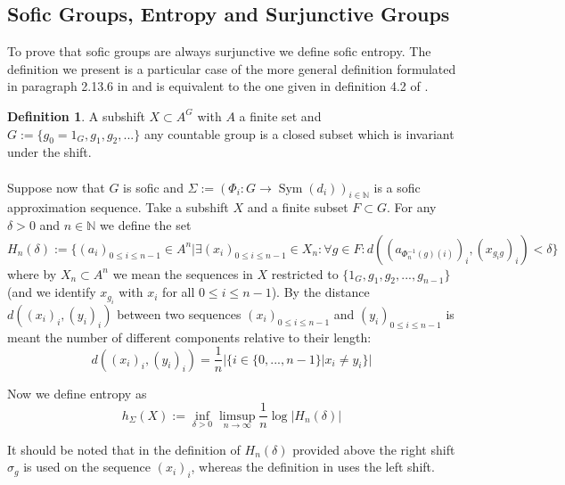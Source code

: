 \documentclass[titlepage, a4paper]{article}
\newcommand{\N}{\mathbb{N}}
\DeclareMathOperator{\sym}{Sym}
\theoremstyle{definition}
\newtheorem{definition}[theorem]{Definition}
\theoremstyle{remark}
\begin{document}
\subsection{Sofic Groups, Entropy and Surjunctive Groups}\label{ssec:sofic_surjunctive}

To prove that sofic groups are always surjunctive we define sofic entropy. The definition we present is a particular case of the more general definition formulated in paragraph 2.13.6 in \cite{capraro_lupini_2015} and is equivalent to the one given in definition 4.2 of \cite{kerr_li_2010}. 

\begin{definition}

A subshift $X \subset A^G$ with $A$ a finite set and $G := \{g_0 = 1_G, g_1, g_2, ...\}$ any countable group is a closed subset which is invariant under the shift.\\
\\
Suppose now that $G$ is sofic and $\Sigma := (\Phi_i: G \to \sym(d_i))_{i \in \N}$ is a sofic approximation sequence. Take a subshift $X$ and a finite subset $F \subset G$. For any $\delta > 0$ and $n \in \N$ we define the set 
		\[
		H_n (\delta) := \{(a_i)_{0 \leq i \leq n-1} \in A^n | 
						\exists (x_i)_{0 \leq i \leq n-1} \in X_n : 
						\forall g \in F: d((a_{\Phi^{-1}_n(g)(i)})_i,(x_{ g_i g})_i) < \delta \}
		\]
		where by $X_n \subset A^n$ we mean the sequences in $X$ restricted to $\{1_G, g_1, g_2, ..., g_{n-1}\}$ (and we identify $x_{g_i}$ with $x_i$ for all $0 \leq i \leq n-1$). By the distance $d((x_i)_i, (y_i)_i)$ between two sequences $(x_i)_{0 \leq i \leq n-1}$ and $(y_i)_{0 \leq i \leq n-1}$ is meant the number of different components relative to their length:
		\[
		d((x_i)_i, (y_i)_i) = \frac{1}{n} |\{i \in \{0, ..., n-1\}|x_i \neq y_i\}|
		\]
				

		Now we define entropy as 
		\[
		h_\Sigma(X) := \inf_{\delta>0} \limsup_{n \to \infty} \frac{1}{n} \log |H_n(\delta)|
		\]
\end{definition}

It should be noted that in the definition of $H_n(\delta)$ provided above the right shift $\sigma_g$ is used on the sequence $(x_i)_i$, whereas the definition in \cite[paragraph 2.13.6]{capraro_lupini_2015} uses the left shift.\\
\end{document}
